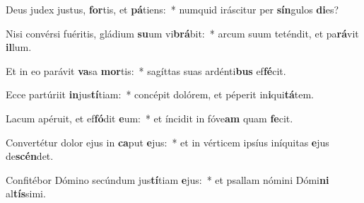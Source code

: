 \item Deus judex justus, \textbf{for}tis, et \textbf{pá}tiens:~* numquid iráscitur per \textbf{sín}gulos \textbf{di}es?
\item Nisi convérsi fuéritis, gládium \textbf{su}um vi\textbf{brá}bit:~* arcum suum teténdit, et pa\textbf{rá}vit \textbf{il}lum.
\item Et in eo parávit \textbf{va}sa \textbf{mor}tis:~* sagíttas suas ardénti\textbf{bus} ef\textbf{fé}cit.
\item Ecce partúriit \textbf{in}jus\textbf{tí}tiam:~* concépit dolórem, et péperit in\textbf{i}qui\textbf{tá}tem.
\item Lacum apéruit, et ef\textbf{fó}dit \textbf{e}um:~* et íncidit in fóve\textbf{am} quam \textbf{fe}cit.
\item Convertétur dolor ejus in \textbf{ca}put \textbf{e}jus:~* et in vérticem ipsíus iníquitas \textbf{e}jus de\textbf{scén}det.
\item Confitébor Dómino secúndum jus\textbf{tí}tiam \textbf{e}jus:~* et psallam nómini Dómi\textbf{ni} al\textbf{tís}simi.

